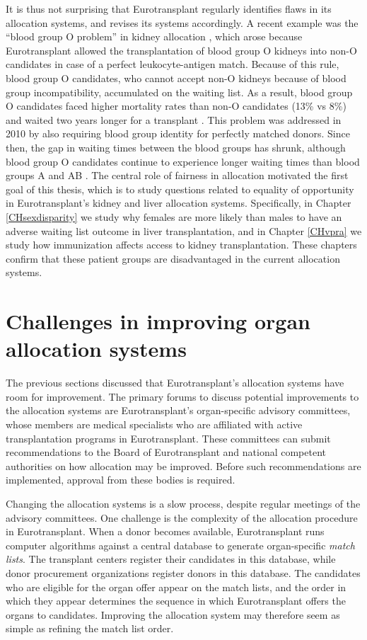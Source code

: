 \documentclass[11pt,twoside,]{book}
\begin{document}
It is thus not surprising that Eurotransplant regularly identifies flaws
in its allocation systems, and revises its systems accordingly. A recent example was the ``blood group O problem'' in kidney
allocation \citep{glander2010}, which arose because Eurotransplant allowed the
transplantation of blood group O kidneys into non-O candidates in case of a perfect
leukocyte-antigen match. Because of this rule, blood group O candidates, who cannot accept non-O
kidneys because of blood group incompatibility, accumulated on the waiting list.
As a result, blood group O candidates faced higher mortality rates than non-O
candidates (13\% vs 8\%) and waited two years longer for a transplant \citep{glander2010}.
This problem was addressed in 2010 by also requiring blood
group identity for perfectly matched donors.
Since then, the gap in waiting times between the blood groups has
shrunk, although blood group O candidates continue to experience longer waiting times
than blood groups A and AB \citep{etStatsLibrary2194P}.
\newpage
The central role of fairness in allocation motivated the first goal of this thesis, which is to
study questions related to equality of opportunity in Eurotransplant's kidney
and liver allocation systems. Specifically,
in Chapter \ref{CHsexdisparity} we study why females are more likely than males
to have an adverse waiting list outcome in liver transplantation, and in Chapter
\ref{CHvpra} we study how immunization affects access to kidney
transplantation. These chapters confirm
that these patient groups are disadvantaged in the current allocation systems.

\section{Challenges in improving organ allocation systems}\label{challenges-in-improving-organ-allocation-systems}

The previous sections discussed that Eurotransplant's allocation systems have
room for improvement. The primary
forums to discuss potential improvements to the allocation systems are
Eurotransplant's organ-specific advisory committees, whose members are
medical specialists who are affiliated with active transplantation programs in Eurotransplant.
These committees can submit recommendations to the
Board of Eurotransplant and national competent authorities on how allocation
may be improved. Before such recommendations are implemented, approval from
these bodies is required.

Changing the allocation systems is a slow process, despite regular meetings
of the advisory committees. One challenge is the complexity of the allocation procedure in
Eurotransplant. When a donor becomes available, Eurotransplant runs computer
algorithms against a central database to generate organ-specific \emph{match lists}.
The transplant centers register their candidates in this database, while
donor procurement organizations register donors in this database. The candidates who are
eligible for the organ offer appear on the match lists, and the order
in which they appear determines the sequence in which Eurotransplant
offers the organs to candidates. Improving the
allocation system may therefore seem as simple as refining the match list order.
\end{document}
